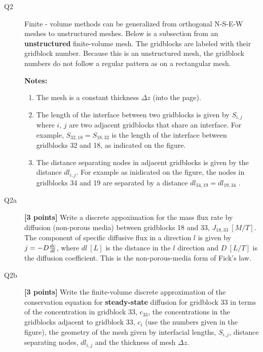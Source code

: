\documentclass{article}
\begin{document}
\newpage
\begin{description}
\item [Q2] Finite - volume methods can be generalized from orthogonal N-S-E-W meshes to unstructured meshes. Below is a subsection from an \textbf{unstructured} finite-volume mesh. The gridblocks are labeled with their gridblock number. Because this is an unstructured mesh, the gridblock numbers do not follow a regular pattern as on a rectangular mesh. \par

\item[] \textbf{Notes:}
\begin{enumerate}
\item The mesh is a constant thickness $\Delta z$ (into the page).
\item The length of the interface between two gridblocks is given by $S_{i,j}$ where $i$, $j$ are two adjacent gridblocks that share an interface. For example, $S_{32,18}=S_{18,32}$ is the length of the interface between gridblocks 32 and 18, as indicated on the figure.
\item The distance separating nodes in adjacent gridblocks is given by the distance $dl_{i,j}$. For example as inidicated on the figure, the nodes in gridblocks 34 and 19 are separated by a distance $dl_{34,19}=dl_{19,34}$ .

\end{enumerate}
\item [Q2a] \textbf{[3 points]} Write a discrete appoximation for the mass flux rate by diffusion (non-porous media) between gridblocks 18 and 33, $J_{18,33}~[M/T]$. The component of specific diffusive flux in a direction $l$ is given by $j=-D{dc\over dl}$, where $dl~[L]$ is the distance in the $l$ direction and $D~[L/T]$ is the diffusion coefficient. This is the non-porous-media form of Fick's law.
\vspace{2.0cm}
\item [Q2b] \textbf{[3 points]} Write the finite-volume discrete approximation of the conservation equation for \textbf{steady-state} diffusion for gridblock 33 in terms of the concentration in gridblock 33, $c_{33}$,  the concentrations in the gridblocks adjacent to gridblock 33, $c_i$ (use the numbers given in the figure), the geometry of the mesh given by interfacial lengths, $S_{i,j}$, distance separating nodes, $dl_{i,j}$ and the thickness of mesh $\Delta z$. 

\end{description}
\end{document}
